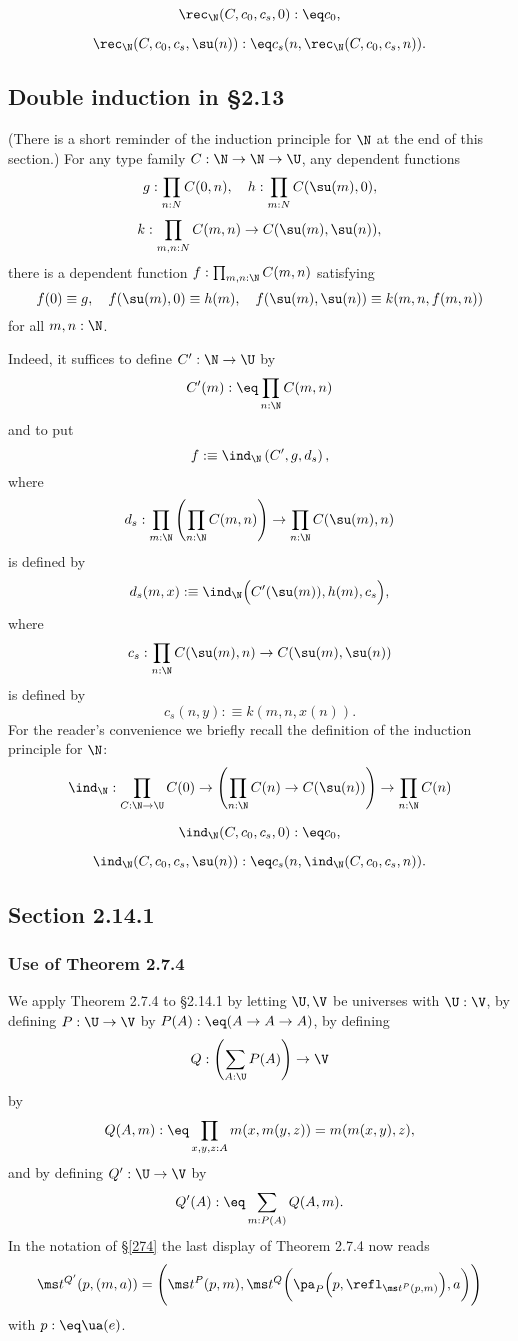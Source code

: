 \documentclass[12pt]{article}
\begin{document}
$$\rec_\N(C,c_0,c_s,0):\eq c_0,$$

$$\rec_\N(C,c_0,c_s,\su(n)):\eq c_s(n,\rec_\N(C,c_0,c_s,n)).$$


\subsection{Double induction in \S2.13}

(There is a short reminder of the induction principle for $\N$ at the end of this section.) For any type family $C:\N\to\N\to\U$, any dependent functions
$$
g:\prod_{n:N}C(0,n),\quad h:\prod_{m:N}C(\su(m),0),
$$
$$
k:\prod_{m,n:N}C(m,n)\to C(\su(m),\su(n)),
$$ 
there is a dependent function $f:\prod_{m,n:\N}C(m,n)$ satisfying 
$$
f(0)\equiv g,\quad f(\su(m),0)\equiv h(m),\quad f(\su(m),\su(n))\equiv k(m,n,f(m,n))
$$ 
for all $m,n:\N$.

Indeed, it suffices to define $C':\N\to\U$ by 
$$
C'(m):\eq\prod_{n:\N}C(m,n)
$$ 
and to put 
$$
f:\equiv\ind_\N\left(C',g,d_s\right),
$$ 
where 
$$
d_s:\prod_{m:\N}\left(\prod_{n:\N}C(m,n)\right)\to\prod_{n:\N}C(\su(m),n)
$$ 
is defined by 
$$
d_s(m,x):\equiv\ind_\N\Big(C'(\su(m)),h(m),c_s\Big),
$$ 
where 
$$
c_s:\prod_{n:\N}C(\su(m),n)\to C(\su(m),\su(n))
$$ 
is defined by 
$$
c_s(n,y):\equiv k(m,n,x(n)).
$$ 
For the reader's convenience we briefly recall the definition of the induction principle for $\N$:
$$\ind_\N:\prod_{C:\N\to\U}C(0)\to\left(\prod_{n:\N}C(n)\to C(\su(n))\right)\to\prod_{n:\N} C(n)$$

$$\ind_\N(C,c_0,c_s,0):\eq c_0,$$

$$\ind_\N(C,c_0,c_s,\su(n)):\eq c_s(n,\ind_\N(C,c_0,c_s,n)).$$


\subsection{Section 2.14.1}

\subsubsection{Use of Theorem 2.7.4}

We apply Theorem 2.7.4 to \S2.14.1 by letting $\U,\V$ be universes with $\U:\V$, by defining $P:\U\to\V$ by $P(A):\eq(A\to A\to A)$, by defining 
$$
Q:\left(\sum_{A:\U}P(A)\right)\to\V
$$ 
by 
$$
Q(A,m):\eq\prod_{x,y,z:A}m(x,m(y,z))=m(m(x,y),z),
$$ 
and by defining $Q':\U\to\V$ by 
$$ 
Q'(A):\eq\sum_{m:P(A)}Q(A,m).
$$
In the notation of \S\ref{274} the last display of Theorem 2.7.4 now reads 
$$
\ms t^{Q'}(p,(m,a))=\Bigg(\ms t^P(p,m),\ms t^Q\bigg(\pa_P\Big(p,\refl_{\ms t^P(p,m)}\Big),a\bigg)\Bigg)
$$ 
with $p:\eq\ua(e)$.
\end{document}
